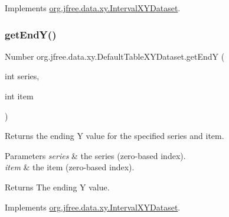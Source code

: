 Implements \mbox{\hyperlink{interfaceorg_1_1jfree_1_1data_1_1xy_1_1_interval_x_y_dataset_a93161a6d6c1db37cfac030239c62ab0a}{org.\+jfree.\+data.\+xy.\+Interval\+X\+Y\+Dataset}}.

\mbox{\label{classorg_1_1jfree_1_1data_1_1xy_1_1_default_table_x_y_dataset_ae0d28b2da1af879209a1c47c07ab3141}} 
\subsubsection{\texorpdfstring{get\+End\+Y()}{getEndY()}}
{\footnotesize\ttfamily Number org.\+jfree.\+data.\+xy.\+Default\+Table\+X\+Y\+Dataset.\+get\+EndY (\begin{DoxyParamCaption}\item[{int}]{series,  }\item[{int}]{item }\end{DoxyParamCaption})}

Returns the ending Y value for the specified series and item.


\begin{DoxyParams}{Parameters}
{\em series} & the series (zero-\/based index). \\
\hline
{\em item} & the item (zero-\/based index).\\
\hline
\end{DoxyParams}
\begin{DoxyReturn}{Returns}
The ending Y value. 
\end{DoxyReturn}


Implements \mbox{\hyperlink{interfaceorg_1_1jfree_1_1data_1_1xy_1_1_interval_x_y_dataset_ae938af574bad07e7f47a8b423223ef9b}{org.\+jfree.\+data.\+xy.\+Interval\+X\+Y\+Dataset}}.

\mbox{\label{classorg_1_1jfree_1_1data_1_1xy_1_1_default_table_x_y_dataset_a2d20d1d5dd0249e24fb60675afc03b55}} 

